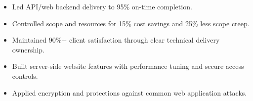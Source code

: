 \begin{itemize}
\item Led API/web backend delivery to 95\% on-time completion.
\item Controlled scope and resources for 15\% cost savings and 25\% less scope creep.
\item Maintained 90\%+ client satisfaction through clear technical delivery ownership.
\end{itemize}
\divider

\begin{itemize}
\item Built server-side website features with performance tuning and secure access controls.
\item Applied encryption and protections against common web application attacks.
\end{itemize}

\newpage
\switchcolumn
